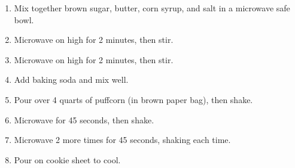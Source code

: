 \documentclass[letterpaper]{recipe}
\begin{document}
 


\begin{enumerate}
\addtolength{\itemindent}{2em}
\item Mix together brown sugar, butter, corn syrup, and salt in a microwave safe bowl.
\item Microwave on high for 2 minutes, then stir.
\item Microwave on high for 2 minutes, then stir.
\item Add baking soda and mix well.
\item Pour over 4 quarts of puffcorn (in brown paper bag), then shake.
\item Microwave for 45 seconds, then shake.
\item Microwave 2 more times for 45 seconds, shaking each time.
\item Pour on cookie sheet to cool.
\end{enumerate}
\end{document}
